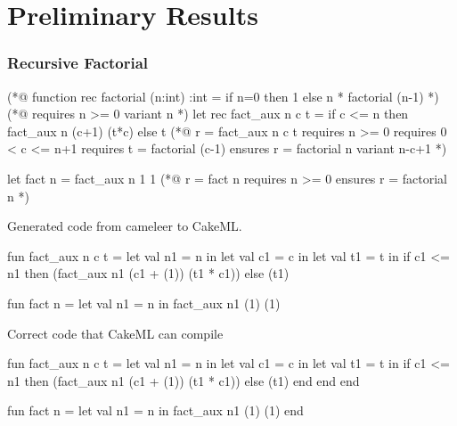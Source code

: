 
%

\chapter{Preliminary Results}
\label{cha:Preliminary_Results}


\subsection{Recursive Factorial}

\begin{gospell}
(*@ 
  function rec factorial (n:int) :int = 
    if n=0 then 1 else n * factorial (n-1)
*)
(*@ 
  requires n >= 0
  variant n
*)
let rec fact_aux n c t =
  if c <= n then fact_aux n (c+1) (t*c) else t
(*@
  r = fact_aux n c t
  requires n >= 0
  requires 0 < c <= n+1
  requires t = factorial (c-1)
  ensures r = factorial n
  variant n-c+1
*)


let fact n = fact_aux n 1 1
(*@ 
  r = fact n
  requires n >= 0 
  ensures r = factorial n
*)
\end{gospell}

Generated code from cameleer to CakeML.

\begin{cakeml}
fun fact_aux n c t = let val n1 = n in
  let val c1 = c in
  let val t1 = t in
  if c1 <= n1 then (fact_aux n1 (c1 + (1)) (t1 * c1))  else (t1)

fun fact n = let val n1 = n in fact_aux n1 (1) (1)
\end{cakeml}

Correct code that CakeML can compile

\begin{cakeml}
fun fact_aux n c t = let val n1 = n in
  let val c1 = c in
  let val t1 = t in
  if c1 <= n1 then (fact_aux n1 (c1 + (1)) (t1 * c1))  else (t1)
  end end end

fun fact n = let val n1 = n in fact_aux n1 (1) (1) end
\end{cakeml}

